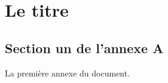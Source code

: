 \documentclass[12pt,maitrise,frenchb,natbib,twoside,initial]{dms}
\numberwithin{equation}{section}
\numberwithin{table}{chapter}
\numberwithin{figure}{chapter}
\begin{document}
% 


%
%

\appendix
\chapter{Le titre}

\section{Section un de l'annexe A}

La premi\`ere annexe du document.
\end{document}
